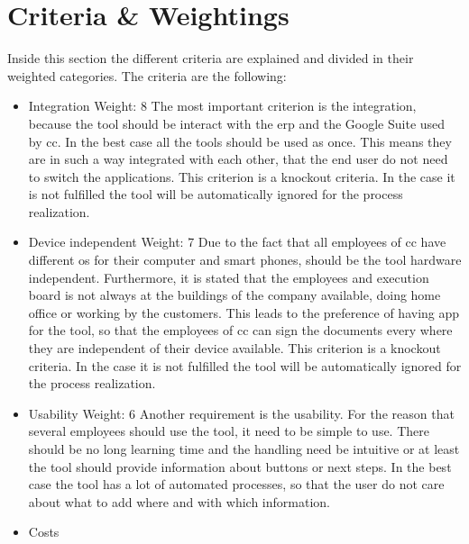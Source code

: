 \section{Criteria \& Weightings} \label{sec:criteria}
Inside this section the different criteria are explained and divided in their
weighted categories. The criteria are the following:
\begin{itemize}
	\item Integration \newline
	Weight: 8 \newline
		The most important criterion is the integration, because the tool should be interact with the \gls{erp} and the Google Suite used by \gls{cc}. In the best case all the tools should be used as once. This means they are in such a way integrated with each other, that the end user do not need to switch the applications. \newline
		This criterion is a knockout criteria. In the case it is not fulfilled the tool will be automatically ignored for the process realization. 
	\item Device independent \newline
	Weight: 7 \newline
	Due to the fact that all employees of \gls{cc} have different \gls{os} for their computer and smart phones, should be the tool hardware independent. Furthermore, it is stated that the employees and execution board is not always at the buildings of the company available, doing home office or working by the customers. This leads to the preference of having \gls{app} for the tool, so that the employees of \gls{cc} can sign the documents every where they are independent of their device available.\newline
	This criterion is a knockout criteria. In the case it is not fulfilled the tool will be automatically ignored for the process realization. 
	\item Usability \newline
	Weight: 6 \newline
	Another requirement is the usability. For the reason that several employees should use the tool, it need to be simple to use. There should be no long learning time and the handling need be intuitive or at least the tool should provide information about buttons or next steps. In the best case the tool has a lot of automated processes, so that the user do not care about what to add where and with which information.
	\item Costs \newline

\end{itemize}
